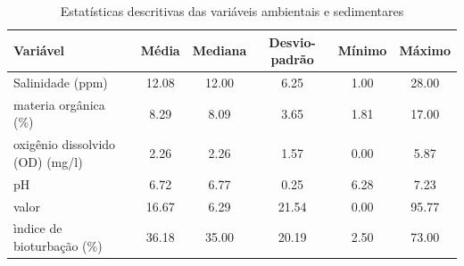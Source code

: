 \begin{table}[!h]
\centering
\caption{\label{tab:tab:desc}Estatísticas descritivas das variáveis ambientais e sedimentares}
\centering
\begin{tabular}[t]{lccccc}
\toprule
Variável & Média & Mediana & Desvio-padrão & Mínimo & Máximo\\
\midrule
Salinidade (ppm) & 12.08 & 12.00 & 6.25 & 1.00 & 28.00\\
materia orgânica (\%) & 8.29 & 8.09 & 3.65 & 1.81 & 17.00\\
oxigênio dissolvido (OD) (mg/l) & 2.26 & 2.26 & 1.57 & 0.00 & 5.87\\
pH & 6.72 & 6.77 & 0.25 & 6.28 & 7.23\\
valor & 16.67 & 6.29 & 21.54 & 0.00 & 95.77\\
\addlinespace
ìndice de bioturbação (\%) & 36.18 & 35.00 & 20.19 & 2.50 & 73.00\\
\bottomrule
\end{tabular}
\end{table}
